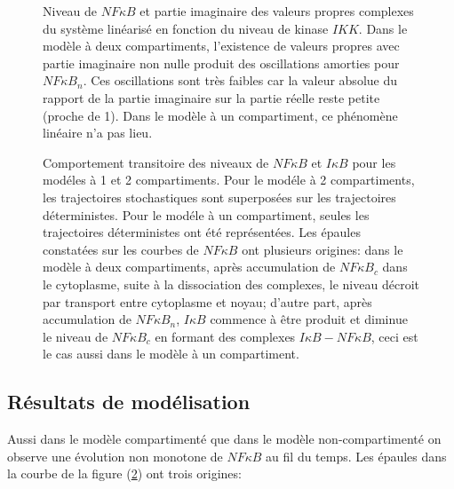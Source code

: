 \documentclass{article}
\def\magenta{\color{goldenrod}}
\begin{document}
\begin{figure}[h]

\begin{center}
\epsfysize=3.5in 
\end{center}

{\large Niveau de $NF\kappa B$ et partie imaginaire des valeurs
propres complexes du syst{\`e}me lin{\'e}aris{\'e} en fonction du niveau de
kinase $IKK$. Dans le mod{\`e}le {\`a} deux compartiments, l'existence de
valeurs propres avec partie imaginaire non nulle produit des
oscillations amorties pour $NF\kappa B_n$. Ces oscillations sont
tr{\`e}s faibles car la valeur absolue du rapport de la partie
imaginaire sur la partie r{\'e}elle reste petite (proche de 1). Dans
le mod{\`e}le {\`a} un compartiment, ce ph{\'e}nom{\`e}ne lin{\'e}aire n'a pas lieu.}
\label{fig:5.1}
\end{figure}

\begin{figure}[h]


\begin{center}
\epsfysize=3.5in 
\end{center}


{\large Comportement transitoire des niveaux de $NF\kappa B$ et
$I\kappa B$ pour les mod{\'e}les {\`a} 1 et 2 compartiments. Pour le
mod{\'e}le {\`a} 2 compartiments, les trajectoires stochastiques sont
superpos{\'e}es sur les trajectoires d{\'e}terministes. Pour le mod{\'e}le {\`a}
un compartiment, seules les trajectoires d{\'e}terministes ont {\'e}t{\'e}
repr{\'e}sent{\'e}es. Les {\'e}paules constat{\'e}es sur les courbes de $NF\kappa
B$ ont plusieurs origines: dans le mod{\`e}le {\`a} deux compartiments,
apr{\`e}s accumulation de $NF\kappa B_c$ dans le cytoplasme, suite {\`a}
la dissociation des complexes, le niveau d{\'e}croit par transport
entre cytoplasme et noyau; d'autre part, apr{\`e}s accumulation de
$NF\kappa B_n$, $I\kappa B$ commence {\`a} {\^e}tre produit et diminue le
niveau de $NF\kappa B_c$ en formant des complexes $I\kappa
B-NF\kappa B$, ceci est le cas aussi dans le mod{\`e}le {\`a} un
compartiment. } \label{fig:5.2}
\end{figure}


\subsection{\magenta \textsf{\Large R{\'e}sultats de mod{\'e}lisation}}

Aussi dans le mod{\`e}le compartiment{\'e} que dans le mod{\`e}le
non-compartiment{\'e} on observe une {\'e}volution non monotone de
$NF\kappa B$ au fil du temps. Les {\'e}paules dans la courbe de la
figure (\ref{fig:5.2}) ont trois origines:
\end{document}
